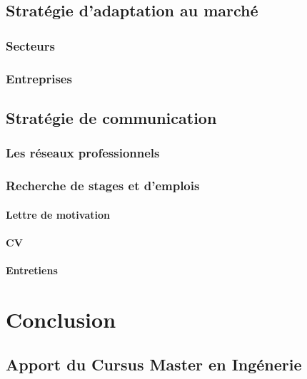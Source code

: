 \documentclass[a4paper,12pt, draft]{report}
\begin{document}
\chapter{Stratégie d'adaptation au marché}
\section{Secteurs}
\section{Entreprises}

\chapter{Stratégie de communication}
\section{Les réseaux professionnels}
\section{Recherche de stages et d'emplois}
\subsection{Lettre de motivation}
\subsection{CV}
\subsection{Entretiens}

\part{Conclusion}
\chapter{Apport du Cursus Master en Ingénerie}


\listoffigures{}

\tableofcontents{}
\end{document}

